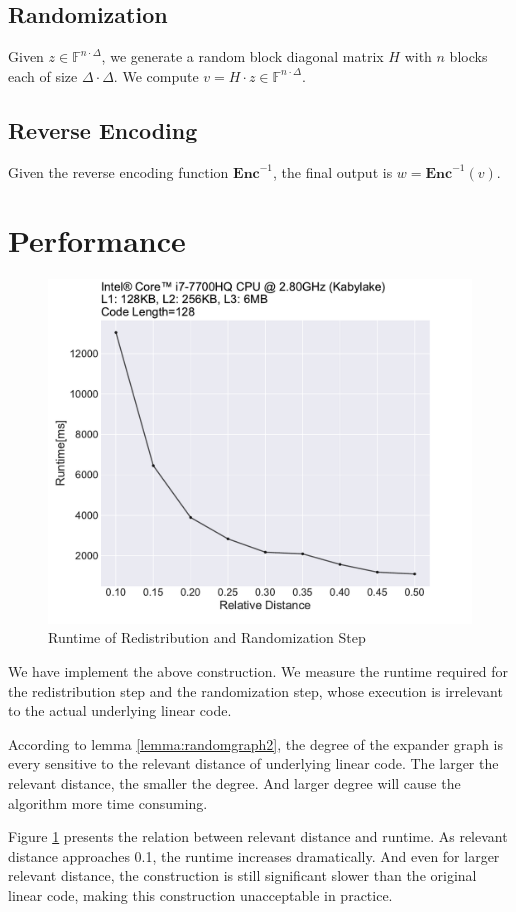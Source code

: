 \subsection{Randomization}

Given $z \in \mathbb{F}^{n \cdot \Delta}$, we generate a random block diagonal matrix $H$ with $n$ blocks each of size $\Delta \cdot \Delta$. We compute $v = H \cdot z \in \mathbb{F}^{n \cdot \Delta}$.

\subsection{Reverse Encoding}

Given the reverse encoding function $\textbf{Enc}^{-1}$, the final output is $w = \textbf{Enc}^{-1}(v)$.

\section{Performance}

\begin{figure}[h]
    \centering
    \includegraphics[width=1\textwidth]{graph/degree.pdf}
    \caption{Runtime of Redistribution and Randomization Step}
    \label{fig:degree}
\end{figure}


We have implement the above construction. We measure the runtime required for the redistribution step and the randomization step, whose execution is irrelevant to the actual underlying linear code.


According to lemma \ref{lemma:randomgraph2}, the degree of the expander graph is every sensitive to the relevant distance of underlying linear code. The larger the relevant distance, the smaller the degree. And larger degree will cause the algorithm more time consuming.

Figure \ref{fig:degree} presents the relation between relevant distance and runtime. As relevant distance approaches 0.1, the runtime increases dramatically. And even for larger relevant distance, the construction is still significant slower than the original linear code, making this construction unacceptable in practice.